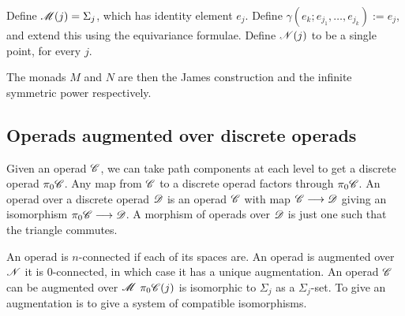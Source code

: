 \documentclass[11pt]{article}
\begin{document}
\begin{chapter1-3}
Define $\mathscr{M}(j)=\Sigma_j$, which has identity element $e_j$. Define
$\gamma(e_k;e_{j_1},\ldots,e_{j_k}):=e_{j}$, and extend this using the
equivariance formulae. Define $\mathscr{N}(j)$ to be a single point, for every $j$.

The monads $M$ and $N$ are then the James construction and the infinite 
symmetric power respectively.
\subsection{Operads augmented over discrete operads}
Given an operad $\mathscr{C}$, we can take path components at each level to get a
discrete operad $\pi_0\mathscr{C}$. Any map from $\mathscr{C}$ to a discrete operad factors
through $\pi_0\mathscr{C}$. An operad over a discrete operad $\mathscr{D}$ is an operad
$\mathscr{C}$ with map $\mathscr{C}\longrightarrow\mathscr{D}$ giving an isomorphism $\pi_0\mathscr{C}\longrightarrow\mathscr{D}$.
A morphism of operads over $\mathscr{D}$ is just one such that the triangle commutes.

An operad is $n$-connected if each of its spaces are. An operad is augmented over
$\mathscr{N}$ \Iff it is $0$-connected, in which case it has a unique augmentation.
An operad $\mathscr{C}$ can be augmented over $\mathscr{M}$ \Iff $\pi_0\mathscr{C}(j)$ is isomorphic
to $\Sigma_j$ as a $\Sigma_j$-set. To give an augmentation is to give a system
of compatible isomorphisms.


\end{chapter1-3}
\end{document}
